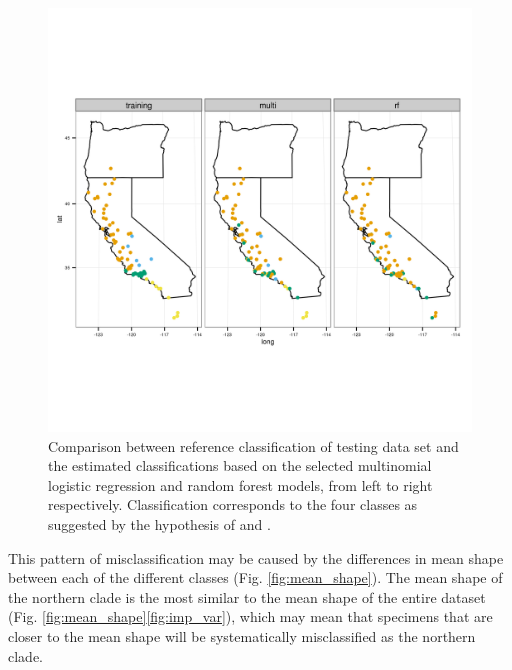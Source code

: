\documentclass[12pt,letterpaper]{article}\usepackage{graphicx, color}
\begin{document}
\begin{figure}[ht]
  \centering
  \includegraphics[width = \textwidth]{figure/gen_map}
  \caption{Comparison between reference classification of testing data set and the estimated classifications based on the selected multinomial logistic regression and random forest models, from left to right respectively. Classification corresponds to the four classes as suggested by the hypothesis of \citet{Spinks2005} and \citet{Spinks2010}.}
  \label{fig:gen_map}
\end{figure}

This pattern of misclassification may be caused by the differences in mean shape between each of the different classes (Fig. \ref{fig:mean_shape}). The mean shape of the northern clade is the most similar to the mean shape of the entire dataset (Fig. \ref{fig:mean_shape}\ref{fig:imp_var}), which may mean that specimens that are closer to the mean shape will be systematically misclassified as the northern clade.
\end{document}
